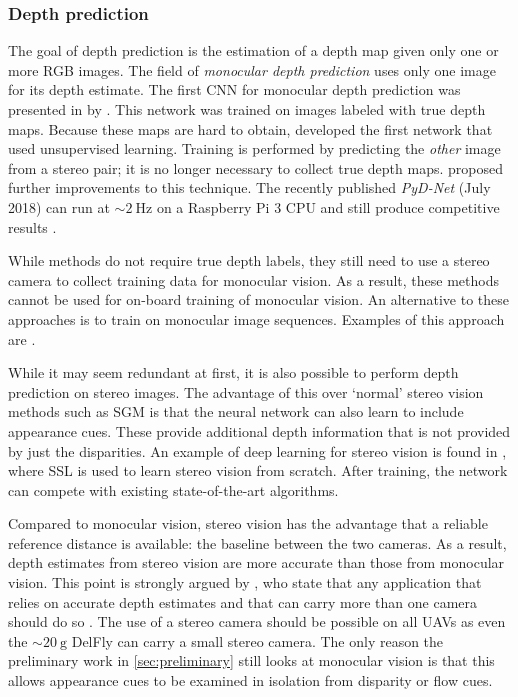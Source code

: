 \subsubsection{Depth prediction}
The goal of depth prediction is the estimation of a depth map given only one or more RGB images.
The field of \emph{monocular depth prediction} uses only one image for its depth estimate.
The first \ac{CNN} for monocular depth prediction was presented in \citeyear{Eigen2014} by \citeauthor{Eigen2014} \cite{Eigen2014}.
This network was trained on images labeled with true depth maps.
Because these maps are hard to obtain, \citeauthor{Garg2016} \cite{Garg2016} developed the first network that used unsupervised learning.
Training is performed by predicting the \emph{other} image from a stereo pair; it is no longer necessary to collect true depth maps.
\citeauthor{Godard2017} \cite{Godard2017} proposed further improvements to this technique.
The recently published \emph{PyD-Net} (July 2018) can run at $\sim\!\SI{2}{\Hz}$ on a Raspberry Pi 3 CPU and still produce competitive results \cite{Poggi2018}.

While methods \cite{Garg2016,Godard2017} do not require true depth labels, they still need to use a stereo camera to collect training data for monocular vision.
As a result, these methods cannot be used for on-board training of monocular vision.
An alternative to these approaches is to train on monocular image sequences.
Examples of this approach are \cite{Vijayanarasimhan2017,Jiang2017,Zhou2017}.

While it may seem redundant at first, it is also possible to perform depth prediction on stereo images.
The advantage of this over `normal' stereo vision methods such as \ac{SGM} is that the neural network can also learn to include appearance cues.
These provide additional depth information that is not provided by just the disparities.
An example of deep learning for stereo vision is found in \cite{Zhong2017}, where \ac{SSL} is used to learn stereo vision from scratch.
After training, the network can compete with existing state-of-the-art algorithms.

Compared to monocular vision, stereo vision has the advantage that a reliable reference distance is available: the baseline between the two cameras.
As a result, depth estimates from stereo vision are more accurate than those from monocular vision.
This point is strongly argued by \citeauthor{Smolyanskiy2018}, who state that any application that relies on accurate depth estimates and that can carry more than one camera should do so \cite{Smolyanskiy2018}.
The use of a stereo camera should be possible on all \acp{UAV} as even the $\sim\!\SI{20}{\g}$ DelFly can carry a small stereo camera.
The only reason the preliminary work in \autoref{sec:preliminary} still looks at monocular vision is that this allows appearance cues to be examined in isolation from disparity or flow cues.


